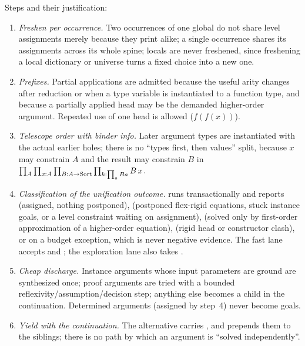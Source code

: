 Steps and their justification:
\begin{enumerate}
\item \emph{Freshen per occurrence.} Two occurrences of one global do not share level assignments merely because they print alike; a single occurrence shares its assignments across its whole spine; locals are never freshened, since freshening a local dictionary or universe turns a fixed choice into a new one.
\item \emph{Prefixes.} Partial applications are admitted because the useful arity changes after reduction or when a type variable is instantiated to a function type, and because a partially applied head may be the demanded higher-order argument. Repeated use of one head is allowed ($f(f(x))$).
\item \emph{Telescope order with binder info.} Later argument types are instantiated with the actual earlier holes; there is no ``types first, then values'' split, because $x$ may constrain $A$ and the result may constrain $B$ in $\prod_{A}\prod_{x:A}\prod_{B:A\to\mathrm{Sort}}\prod_{k:\prod_a B a} B\,x$.
\item \emph{Classification of the unification outcome.}  runs  transactionally and reports  (assigned, nothing postponed),  (postponed flex-rigid equations, stuck instance goals, or a level constraint waiting on assignment),  (solved only by first-order approximation of a higher-order equation),  (rigid head or constructor clash), or  on a budget exception, which is never negative evidence. The fast lane accepts  and ; the exploration lane also takes .
\item \emph{Cheap discharge.} Instance arguments whose input parameters are ground are synthesized once; proof arguments are tried with a bounded reflexivity/assumption/decision step; anything else becomes a child in the continuation. Determined arguments (assigned by step~4) never become goals.
\item \emph{Yield with the continuation.} The alternative carries , and  prepends them to the siblings; there is no path by which an argument is ``solved independently''.
\end{enumerate}

